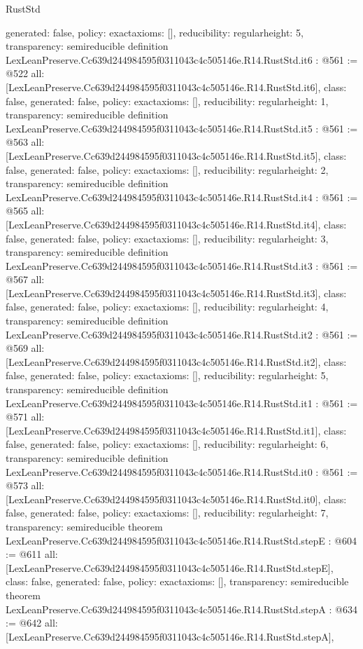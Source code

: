 \begin{lexlean}{RustStd}
\begin{coremodule}
{  generated: false,
  policy: exact{axioms: []},
  reducibility: regular{height: 5},
  transparency: semireducible
}
definition LexLeanPreserve.Cc639d244984595f0311043c4c505146e.R14.RustStd.it6 : @561 := @522 {
  all: [LexLeanPreserve.Cc639d244984595f0311043c4c505146e.R14.RustStd.it6],
  class: false,
  generated: false,
  policy: exact{axioms: []},
  reducibility: regular{height: 1},
  transparency: semireducible
}
definition LexLeanPreserve.Cc639d244984595f0311043c4c505146e.R14.RustStd.it5 : @561 := @563 {
  all: [LexLeanPreserve.Cc639d244984595f0311043c4c505146e.R14.RustStd.it5],
  class: false,
  generated: false,
  policy: exact{axioms: []},
  reducibility: regular{height: 2},
  transparency: semireducible
}
definition LexLeanPreserve.Cc639d244984595f0311043c4c505146e.R14.RustStd.it4 : @561 := @565 {
  all: [LexLeanPreserve.Cc639d244984595f0311043c4c505146e.R14.RustStd.it4],
  class: false,
  generated: false,
  policy: exact{axioms: []},
  reducibility: regular{height: 3},
  transparency: semireducible
}
definition LexLeanPreserve.Cc639d244984595f0311043c4c505146e.R14.RustStd.it3 : @561 := @567 {
  all: [LexLeanPreserve.Cc639d244984595f0311043c4c505146e.R14.RustStd.it3],
  class: false,
  generated: false,
  policy: exact{axioms: []},
  reducibility: regular{height: 4},
  transparency: semireducible
}
definition LexLeanPreserve.Cc639d244984595f0311043c4c505146e.R14.RustStd.it2 : @561 := @569 {
  all: [LexLeanPreserve.Cc639d244984595f0311043c4c505146e.R14.RustStd.it2],
  class: false,
  generated: false,
  policy: exact{axioms: []},
  reducibility: regular{height: 5},
  transparency: semireducible
}
definition LexLeanPreserve.Cc639d244984595f0311043c4c505146e.R14.RustStd.it1 : @561 := @571 {
  all: [LexLeanPreserve.Cc639d244984595f0311043c4c505146e.R14.RustStd.it1],
  class: false,
  generated: false,
  policy: exact{axioms: []},
  reducibility: regular{height: 6},
  transparency: semireducible
}
definition LexLeanPreserve.Cc639d244984595f0311043c4c505146e.R14.RustStd.it0 : @561 := @573 {
  all: [LexLeanPreserve.Cc639d244984595f0311043c4c505146e.R14.RustStd.it0],
  class: false,
  generated: false,
  policy: exact{axioms: []},
  reducibility: regular{height: 7},
  transparency: semireducible
}
theorem LexLeanPreserve.Cc639d244984595f0311043c4c505146e.R14.RustStd.stepE : @604 := @611 {
  all: [LexLeanPreserve.Cc639d244984595f0311043c4c505146e.R14.RustStd.stepE],
  class: false,
  generated: false,
  policy: exact{axioms: []},
  transparency: semireducible
}
theorem LexLeanPreserve.Cc639d244984595f0311043c4c505146e.R14.RustStd.stepA : @634 := @642 {
  all: [LexLeanPreserve.Cc639d244984595f0311043c4c505146e.R14.RustStd.stepA],
}
\end{coremodule}
\end{lexlean}
